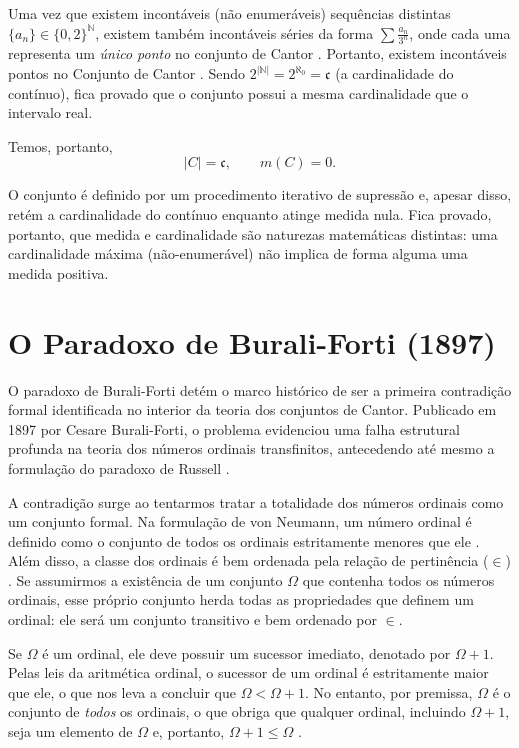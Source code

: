 Uma vez que existem incontáveis (não enumeráveis) sequências distintas \(\{a_n\} \in \{0, 2\}^{\mathbb{N}}\), existem também incontáveis séries da forma \(\sum \frac{a_n}{3^n}\), onde cada uma representa um \textit{único ponto} no conjunto de Cantor . Portanto, existem incontáveis pontos no Conjunto de Cantor . Sendo \(2^{|\mathbb{N}|} = 2^{\aleph_0} = \mathfrak{c}\) (a cardinalidade do contínuo), fica provado que o conjunto possui a mesma cardinalidade que o intervalo real.

Temos, portanto,
\[
    |C| = \mathfrak{c},
    \qquad
    m(C) = 0.
\]

O conjunto é definido por um procedimento iterativo de supressão e, apesar disso, retém a cardinalidade do contínuo enquanto atinge medida nula. Fica provado, portanto, que medida e cardinalidade são naturezas matemáticas distintas: uma cardinalidade máxima (não-enumerável) não implica de forma alguma uma medida positiva.

\section{O Paradoxo de Burali-Forti (1897)}

O paradoxo de Burali-Forti detém o marco histórico de ser a primeira contradição formal identificada no interior da teoria dos conjuntos de Cantor. Publicado em 1897 por Cesare Burali-Forti, o problema evidenciou uma falha estrutural profunda na teoria dos números ordinais transfinitos, antecedendo até mesmo a formulação do paradoxo de Russell \parencite[p.~15]{enderton1977}.

A contradição surge ao tentarmos tratar a totalidade dos números ordinais como um conjunto formal. Na formulação de von Neumann, um número ordinal é definido como o conjunto de todos os ordinais estritamente menores que ele \parencite[p.~189]{enderton1977}. Além disso, a classe dos ordinais é bem ordenada pela relação de pertinência (\(\in\)) \parencite[p.~191]{enderton1977}. Se assumirmos a existência de um conjunto \(\Omega\) que contenha todos os números ordinais, esse próprio conjunto herda todas as propriedades que definem um ordinal: ele será um conjunto transitivo e bem ordenado por \(\in\).

Se \(\Omega\) é um ordinal, ele deve possuir um sucessor imediato, denotado por \(\Omega + 1\). Pelas leis da aritmética ordinal, o sucessor de um ordinal é estritamente maior que ele, o que nos leva a concluir que \(\Omega < \Omega + 1\). No entanto, por premissa, \(\Omega\) é o conjunto de \textit{todos} os ordinais, o que obriga que qualquer ordinal, incluindo \(\Omega + 1\), seja um elemento de \(\Omega\) e, portanto, \(\Omega + 1 \leq \Omega\) \parencite[p.~194]{enderton1977}.

